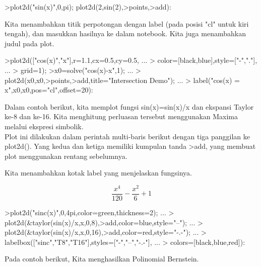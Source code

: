 \documentclass{article}
\begin{document}
\begin{eulernotebook}
\begin{eulercomment}
\begin{eulercomment}
\begin{eulercomment}
\begin{eulercomment}
\begin{eulerprompt}
>plot2d("sin(x)",0,pi); plot2d(2,sin(2),>points,>add):
\end{eulerprompt}
\begin{eulercomment}
Kita menambahkan titik perpotongan dengan label (pada posisi "cl"
untuk kiri tengah), dan masukkan hasilnya ke dalam notebook. Kita juga
menambahkan judul pada plot.
\end{eulercomment}
\begin{eulerprompt}
>plot2d(["cos(x)","x"],r=1.1,cx=0.5,cy=0.5, ...
>  color=[black,blue],style=["-","."], ...
>  grid=1);
>x0=solve("cos(x)-x",1);  ...
>  plot2d(x0,x0,>points,>add,title="Intersection Demo");  ...
>  label("cos(x) = x",x0,x0,pos="cl",offset=20):
\end{eulerprompt}
\begin{eulercomment}
Dalam contoh berikut, kita memplot fungsi sin(x)=sin(x)/x dan ekspansi
Taylor ke-8 dan ke-16. Kita menghitung perluasan tersebut menggunakan
Maxima melalui ekspresi simbolik.\\
Plot ini dilakukan dalam perintah multi-baris berikut dengan tiga
panggilan ke plot2d(). Yang kedua dan ketiga memiliki kumpulan tanda
\textgreater{}add, yang membuat plot menggunakan rentang sebelumnya.

Kita menambahkan kotak label yang menjelaskan fungsinya.
\end{eulercomment}
\begin{eulerformula}
\[
\frac{x^4}{120}-\frac{x^2}{6}+1
\]
\end{eulerformula}
\begin{eulerprompt}
>plot2d("sinc(x)",0,4pi,color=green,thickness=2); ...
>  plot2d(&taylor(sin(x)/x,x,0,8),>add,color=blue,style="--"); ...
>  plot2d(&taylor(sin(x)/x,x,0,16),>add,color=red,style="-.-"); ...
>  labelbox(["sinc","T8","T16"],styles=["-","--","-.-"], ...
>    colors=[black,blue,red]):
\end{eulerprompt}
\begin{eulercomment}
Pada contoh berikut, Kita menghasilkan Polinomial Bernstein.


\end{eulercomment}
\end{eulercomment}
\end{eulercomment}
\end{eulercomment}
\end{eulercomment}
\end{eulernotebook}
\end{document}
